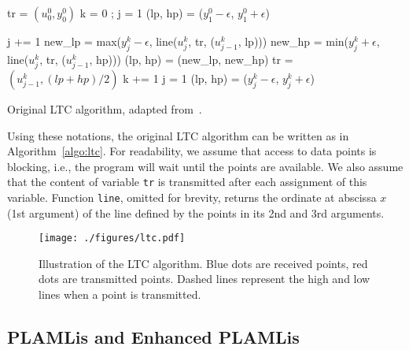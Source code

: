 \begin{algorithm}
\begin{algorithmic}[1]
\Input
\EndInput
\Output
\EndOutput
\State tr = $(u^0_0, y^0_0)$ 
\State k = 0 ; j = 1
\State (lp, hp) = ($y^0_1 - \epsilon$, $y^0_1 + \epsilon$) 

 
    \State j += 1
    \State new\_lp = max($y^k_j-\epsilon$, line($u^k_j$, tr, ($u^k_{j-1}$, lp)))
    \State new\_hp = min($y^k_j+\epsilon$, line($u^k_j$, tr, ($u^k_{j-1}$, hp)))
     
        \State (lp, hp) = (new\_lp, new\_hp)
    \Else
        \State tr = $(u^k_{j-1}, (lp+hp)/2)$
        \State k += 1
        \State j = 1
        \State (lp, hp) = ($y^k_j-\epsilon$, $y^k_j+\epsilon$)
    \EndIf
\EndWhile
\end{algorithmic}
\caption{Original LTC algorithm, adapted from~\cite{schoellhammer2004lightweight}.}
\label{algo:ltc}
\end{algorithm}

Using these notations, the original LTC algorithm can
be written as in Algorithm~\ref{algo:ltc}. For readability, we assume
that access to data points is blocking, i.e., the program will wait
until the points are available. We also assume that the content of
variable \texttt{tr} is transmitted after each assignment of this
variable. Function \texttt{line}, omitted for brevity, returns the
ordinate at abscissa $x$ (1st argument) of the line defined by the points
in its 2nd and 3rd arguments.

\begin{figure}[b]
\centering
\texttt{[image: ./figures/ltc.pdf]}
\caption{Illustration of the LTC algorithm. Blue 
dots are received points, red dots are transmitted points. Dashed lines 
represent the high and low lines when a point is 
transmitted.\vspace*{-0.3cm}}
\label{fig:ltc}
\end{figure}

\subsection{PLAMLis and Enhanced PLAMLis}

